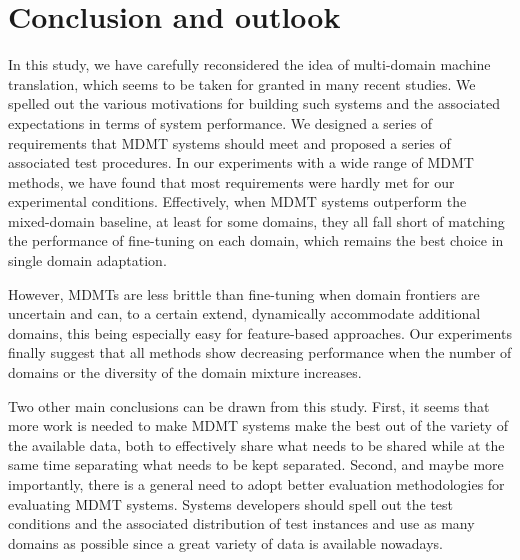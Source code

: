 \section{Conclusion and outlook \label{sec:conclusion-chap4}}

In this study, we have carefully reconsidered the idea of multi-domain machine translation, which seems to be taken for granted in many recent studies. We spelled out the various motivations for building such systems and the associated expectations in terms of system performance. We designed a series of requirements that MDMT systems should meet and proposed a series of associated test procedures. In our experiments with a wide range of MDMT methods, we have found that most requirements were hardly met for our experimental conditions. Effectively, when MDMT systems outperform the mixed-domain baseline, at least for some domains, they all fall short of matching the performance of fine-tuning on each domain, which remains the best choice in single domain adaptation.

However, MDMTs are less brittle than fine-tuning when domain frontiers are uncertain and can, to a certain extend, dynamically accommodate additional domains, this being especially easy for feature-based approaches. Our experiments finally suggest that all methods show decreasing performance when the number of domains or the diversity of the domain mixture increases.

Two other main conclusions can be drawn from this study. First, it seems that more work is needed to make MDMT systems make the best out of the variety of the available data, both to effectively share what needs to be shared while at the same time separating what needs to be kept separated. Second, and maybe more importantly, there is a general need to adopt better evaluation methodologies for evaluating MDMT systems. Systems developers should spell out the test conditions and the associated distribution of test instances and use as many domains as possible since a great variety of data is available nowadays.




